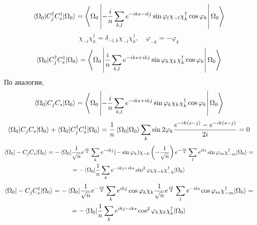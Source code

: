 \documentclass[12pt]{article}
\theoremstyle{definition}
\begin{document}
\begin{enumerate}
\begin{itemize}
\begin{equation}
        \end{equation}
        \begin{equation}
            \braket{\Omega_0|C^\dagger_jC^\dagger_s|\Omega_0}=\left<\Omega_0\left|-\frac{i}{n}\sum\limits_{k,l}e^{-iks-ilj}\sin\varphi_l\chi_{-l}\chi^\dagger_k\cos\varphi_k\right|\Omega_0\right>
        \end{equation}
        \begin{equation}
            \chi_{-l}\chi^\dagger_k=\delta_{-l,k}\chi_{-l}\chi^\dagger_k,\quad\varphi_{-k}=-\varphi_k
        \end{equation}
        \begin{equation}
            \braket{\Omega_0|C^\dagger_jC^\dagger_s|\Omega_0}=\left<\Omega_0\left|\frac{i}{n}\sum\limits_{k,l}e^{-iks+ikj}\sin\varphi_k\chi_k\chi^\dagger_k\cos\varphi_k\right|\Omega_0\right>
        \end{equation}
        По аналогии,
        \begin{equation}
            \braket{\Omega_0|C_jC_s|\Omega_0}=\left<\Omega_0\left|-\frac{i}{n}\sum\limits_{k,l}e^{-iks+ikj}\sin\varphi_k\chi_k\chi^\dagger_k\cos\varphi_k\right|\Omega_0\right>
        \end{equation}
        \begin{equation}
            \braket{\Omega_0|C_jC_s|\Omega_0}+\braket{\Omega_0|C^\dagger_jC^\dagger_s|\Omega_0}=\frac{1}{n}\braket{\Omega_0|\Omega_0}\sum\limits_k\sin2\varphi_k\frac{e^{-ik(s-j)}-e^{-ik(s-j)}}{2i}=0
        \end{equation}
        \begin{multline}
            \braket{\Omega_0|-C_jC_s|\Omega_0}=-\braket{\Omega_0|\frac{1}{\sqrt{n}}e^\frac{i\pi}{4}\sum\limits_ke^{-ikj}(-\sin\varphi_k)\chi_{-k}\left(-\frac{1}{\sqrt{n}}\right)e^{-\frac{i\pi}{4}}\sum\limits_le^{ils}\sin\varphi_m\chi^\dagger_{-m}|\Omega_0}=\\=-\braket{\Omega_0|\frac{1}{n}\sum\limits_ke^{-ikj+iks}\sin^2\varphi_k\chi_{-k}\chi^\dagger_{-k}|\Omega_0}
        \end{multline}
        \begin{multline}
            \braket{\Omega_0|-C_jC^\dagger_s|\Omega_0}=-\braket{\Omega_0|\frac{1}{\sqrt{n}}e^{-\frac{i\pi}{4}}\sum\limits_ke^{ikj}\cos\varphi_k\chi_k\frac{1}{\sqrt{n}}e^{\frac{i\pi}{4}}\sum\limits_le^{-ils}\cos\varphi_m\chi^\dagger_{-m}|\Omega_0}=\\=-\braket{\Omega_0|\frac{1}{n}\sum\limits_ke^{ikj-iks}\cos^2\varphi_k\chi_k\chi^\dagger_k|\Omega_0}
        \end{multline}

\end{itemize}
\end{enumerate}
\end{document}
